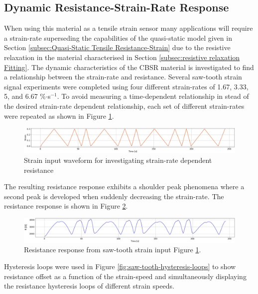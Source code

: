 \subsection{Dynamic Resistance-Strain-Rate Response}
When using this material as a tensile strain sensor many applications will require a strain-rate superseding the capabilities of the quasi-static model given in Section \ref{subsec:Quasi-Static Tensile Resistance-Strain} due to the resistive relaxation in the material characterised in Section \ref{subsec:resistive relaxation Fitting}. The dynamic characteristics of the CBSR material is investigated to find a relationship between the strain-rate and resistance. Several saw-tooth strain signal experiments were completed using four different strain-rates of 1.67, 3.33, 5, and 6.67 \%$\cdot$s$^{-1}$. To avoid measuring a time-dependent relationship in stead of the desired strain-rate dependent relationship, each set of different strain-rates were repeated as shown in Figure \ref{fig:saw-tooth-diff-v}.
\begin{figure}[H]
	\centering
	\includegraphics[width=\linewidth]{Figures/saw_tooth_diff_speeds_strain_only.jpg}
	\caption{Strain input waveform for investigating strain-rate dependent resistance}
	\label{fig:saw-tooth-diff-v}
\end{figure}
The resulting resistance response exhibits a shoulder peak phenomena where a second peak is developed when suddenly decreasing the strain-rate. The resistance response is shown in Figure \ref{fig:saw-tooth-res-response}.
\begin{figure}[H]
	\centering
	\includegraphics[width=\linewidth]{Figures/saw_tooth_diff_speeds_res_only.jpg}
	\caption{Resistance response from saw-tooth strain input Figure \ref{fig:saw-tooth-diff-v}.}
	\label{fig:saw-tooth-res-response}
\end{figure}
Hysteresis loops were used in Figure \ref{fig:saw-tooth-hysteresis-loops} to show resistance offset as a function of the strain-speed and simultaneously displaying the resistance hysteresis loops of different strain speeds. 
